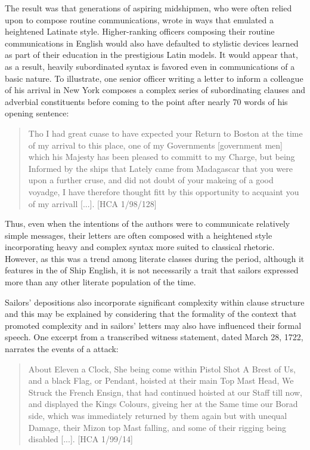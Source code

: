 The result was that generations of aspiring midshipmen, who were often relied upon to compose routine communications, wrote in ways that emulated a heightened Latinate style. Higher-ranking officers composing their routine communications in English would also have defaulted to stylistic devices learned as part of their education in the prestigious Latin models. It would appear that, as a result, heavily subordinated syntax is favored even in communications of a basic nature. To illustrate, one senior officer writing a letter to inform a colleague of his arrival in New York composes a complex series of subordinating clauses and adverbial constituents before coming to the point after nearly 70 words of his opening sentence:

\begin{quotation}
Tho I had great cuase to have expected your Return to Boston at the time of my arrival to this place, one of my Governments [government men] which his Majesty has been pleased to committ to my Charge, but being Informed by the ships that Lately came from Madagascar that you were upon a further cruse, and did not doubt of your makeing of a good voyadge, I have therefore thought fitt by this opportunity to acquaint you of my arrivall [...]. [HCA 1/98/128]
\end{quotation}

Thus, even when the intentions of the authors were to communicate relatively simple messages, their letters are often composed with a heightened style incorporating heavy  and complex syntax more suited to classical rhetoric. However, as this was a trend among literate classes during the period, although it features in the  of Ship English, it is not necessarily a trait that sailors expressed more than any other literate population of the time. 

Sailors’ depositions also incorporate significant complexity within clause structure and this may be explained by considering that the formality of the context that promoted complexity and  in sailors’ letters may also have influenced their formal speech.  One excerpt from a transcribed witness statement, dated March 28, 1722, narrates the events of a  attack:

\begin{quotation}
About Eleven a Clock, She being come within Pistol Shot A Brest of Us, and a black Flag, or Pendant, hoisted at their main Top Mast Head, We Struck the French Ensign, that had continued hoisted at our Staff till now, and displayed the Kings Colours, giveing her at the Same time our Borad side, which was immediately returned by them again but with unequal Damage, their Mizon top Mast falling, and some of their rigging being disabled [...]. [HCA 1/99/14] 
\end{quotation}


